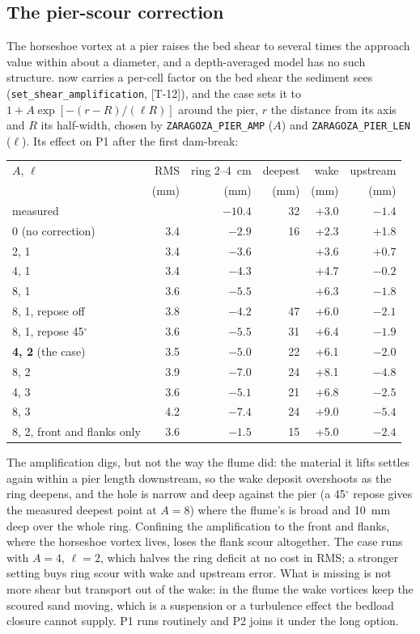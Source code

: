 \subsection*{The pier-scour correction}

The horseshoe vortex at a pier raises the bed shear to several times the
approach value within about a diameter, and a depth-averaged model has no
such structure. \anuga{} now carries a per-cell factor on the bed shear the
sediment sees (\texttt{set\_shear\_amplification}, [T-12]), and the case
sets it to $1 + A \exp[-(r - R)/(\ell R)]$ around the pier, $r$ the
distance from its axis and $R$ its half-width, chosen by
\texttt{ZARAGOZA\_PIER\_AMP} ($A$) and \texttt{ZARAGOZA\_PIER\_LEN} ($\ell$).
Its effect on P1 after the first dam-break:

\begin{center}
\footnotesize
\setlength{\tabcolsep}{3pt}
\begin{tabular}{p{3.0cm}rrrrr}
\hline
$A$, $\ell$ & RMS & ring 2--4~cm & deepest & wake & upstream \\
 & (mm) & (mm) & (mm) & (mm) & (mm) \\
\hline
measured & & $-10.4$ & 32 & +3.0 & $-1.4$ \\
0 (no correction) & 3.4 & $-2.9$ & 16 & +2.3 & +1.8 \\
2, 1 & 3.4 & $-3.6$ & & +3.6 & +0.7 \\
4, 1 & 3.4 & $-4.3$ & & +4.7 & $-0.2$ \\
8, 1 & 3.6 & $-5.5$ & & +6.3 & $-1.8$ \\
8, 1, repose off & 3.8 & $-4.2$ & 47 & +6.0 & $-2.1$ \\
8, 1, repose 45$^\circ$ & 3.6 & $-5.5$ & 31 & +6.4 & $-1.9$ \\
\textbf{4, 2} (the case) & 3.5 & $-5.0$ & 22 & +6.1 & $-2.0$ \\
8, 2 & 3.9 & $-7.0$ & 24 & +8.1 & $-4.8$ \\
4, 3 & 3.6 & $-5.1$ & 21 & +6.8 & $-2.5$ \\
8, 3 & 4.2 & $-7.4$ & 24 & +9.0 & $-5.4$ \\
8, 2, front and flanks only & 3.6 & $-1.5$ & 15 & +5.0 & $-2.4$ \\
\hline
\end{tabular}
\end{center}

The amplification digs, but not the way the flume did: the material it
lifts settles again within a pier length downstream, so the wake deposit
overshoots as the ring deepens, and the hole is narrow and deep against
the pier (a 45$^\circ$ repose gives the measured deepest point at $A = 8$)
where the flume's is broad and 10~mm deep over the whole ring. Confining
the amplification to the front and flanks, where the horseshoe vortex
lives, loses the flank scour altogether. The case runs with $A = 4$,
$\ell = 2$, which halves the ring deficit at no cost in RMS; a stronger
setting buys ring scour with wake and upstream error. What is missing is
not more shear but transport out of the wake: in the flume the wake
vortices keep the scoured sand moving, which is a suspension or a
turbulence effect the bedload closure cannot supply. P1 runs routinely and
P2 joins it under the long option.

